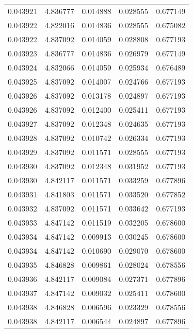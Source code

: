 \begin{tabular}{lrrrr}
0.043921    &  4.836777 &  0.014888 &  0.028555 &             0.677149 \\
0.043922    &  4.822016 &  0.014836 &  0.028555 &             0.675082 \\
0.043922    &  4.837092 &  0.014059 &  0.028808 &             0.677193 \\
0.043923    &  4.836777 &  0.014836 &  0.026979 &             0.677149 \\
0.043924    &  4.832066 &  0.014059 &  0.025934 &             0.676489 \\
0.043925    &  4.837092 &  0.014007 &  0.024766 &             0.677193 \\
0.043926    &  4.837092 &  0.013178 &  0.024897 &             0.677193 \\
0.043926    &  4.837092 &  0.012400 &  0.025411 &             0.677193 \\
0.043927    &  4.837092 &  0.012348 &  0.024635 &             0.677193 \\
0.043928    &  4.837092 &  0.010742 &  0.026334 &             0.677193 \\
0.043929    &  4.837092 &  0.011571 &  0.028555 &             0.677193 \\
0.043930    &  4.837092 &  0.012348 &  0.031952 &             0.677193 \\
0.043930    &  4.842117 &  0.011571 &  0.033259 &             0.677896 \\
0.043931    &  4.841803 &  0.011571 &  0.033520 &             0.677852 \\
0.043932    &  4.837092 &  0.011571 &  0.033642 &             0.677193 \\
0.043933    &  4.847142 &  0.011519 &  0.032205 &             0.678600 \\
0.043934    &  4.847142 &  0.009913 &  0.030245 &             0.678600 \\
0.043934    &  4.847142 &  0.010690 &  0.029070 &             0.678600 \\
0.043935    &  4.846828 &  0.009861 &  0.028024 &             0.678556 \\
0.043936    &  4.842117 &  0.009084 &  0.027371 &             0.677896 \\
0.043937    &  4.847142 &  0.009032 &  0.025411 &             0.678600 \\
0.043938    &  4.846828 &  0.006596 &  0.023329 &             0.678556 \\
0.043938    &  4.842117 &  0.006544 &  0.024897 &             0.677896 \\

\end{tabular}
